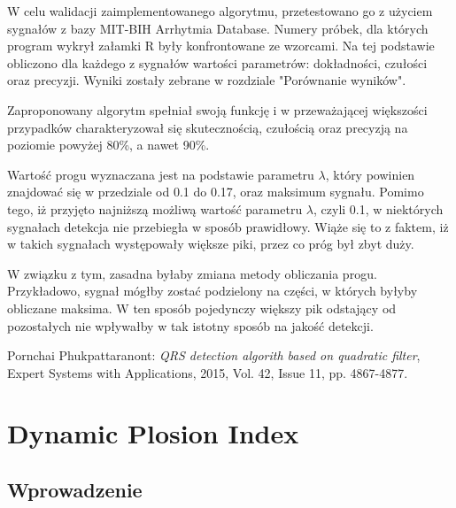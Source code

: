 \documentclass[10pt,a4paper]{article}
\begin{document}
W celu walidacji zaimplementowanego algorytmu, przetestowano go z użyciem sygnałów z bazy MIT-BIH Arrhytmia Database. Numery próbek, dla których program wykrył załamki R były konfrontowane ze wzorcami. Na tej podstawie obliczono dla każdego z sygnałów wartości parametrów: dokładności, czułości oraz precyzji. Wyniki zostały zebrane w rozdziale "Porównanie wyników".

Zaproponowany algorytm spełniał swoją funkcję i w przeważającej większości przypadków charakteryzował się skutecznością, czułością oraz precyzją na poziomie powyżej 80\%, a nawet 90\%. 

Wartość progu wyznaczana jest na podstawie parametru \begin{math}\lambda\end{math}, który powinien znajdować się w przedziale od 0.1 do 0.17, oraz maksimum sygnału. Pomimo tego, iż przyjęto najniższą możliwą wartość parametru \begin{math}\lambda\end{math}, czyli 0.1, w niektórych sygnałach detekcja nie przebiegła w sposób prawidłowy. Wiąże się to z faktem, iż w takich sygnałach występowały większe piki, przez co próg był zbyt duży.

W związku z tym, zasadna byłaby zmiana metody obliczania progu. Przykładowo, sygnał mógłby zostać podzielony na części, w których byłyby obliczane maksima. W ten sposób pojedynczy większy pik odstający od pozostałych nie wpływałby w tak istotny sposób na jakość detekcji.   

\newpage
\begin{thebibliography}{9}
 Pornchai Phukpattaranont: \emph{QRS detection algorith based on quadratic filter}, Expert Systems with Applications, 2015, Vol. 42, Issue 11, pp. 4867-4877. 
\end{thebibliography}

\newpage
\section{Dynamic Plosion Index}

\subsection{Wprowadzenie}
\end{document}
